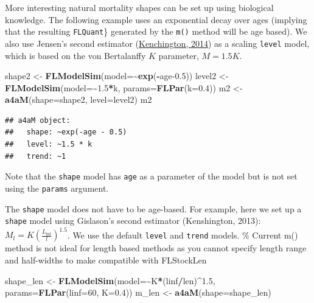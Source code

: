 \documentclass[
]{book}
\newenvironment{Shaded}{\begin{snugshade}}{\end{snugshade}}
\newcommand{\AttributeTok}[1]{\textcolor[rgb]{0.13,0.29,0.53}{#1}}
\newcommand{\DecValTok}[1]{\textcolor[rgb]{0.00,0.00,0.81}{#1}}
\newcommand{\FloatTok}[1]{\textcolor[rgb]{0.00,0.00,0.81}{#1}}
\newcommand{\FunctionTok}[1]{\textcolor[rgb]{0.13,0.29,0.53}{\textbf{#1}}}
\newcommand{\NormalTok}[1]{#1}
\newcommand{\OtherTok}[1]{\textcolor[rgb]{0.56,0.35,0.01}{#1}}
\newcommand{\SpecialCharTok}[1]{\textcolor[rgb]{0.81,0.36,0.00}{\textbf{#1}}}
\begin{document}
More interesting natural mortality shapes can be set up using biological knowledge. The following example uses an exponential decay over ages (implying that the resulting \texttt{FLQuant}\} generated by the \texttt{m()} method will be age based). We also use Jensen's second estimator (\href{http://onlinelibrary.wiley.com/doi/10.1111/faf.12027/abstract}{Kenchington, 2014}) as a scaling \texttt{level} model, which is based on the von Bertalanffy \(K\) parameter, \(M=1.5K\).

\begin{Shaded}
\begin{Highlighting}[]
\NormalTok{shape2 }\OtherTok{\textless{}{-}} \FunctionTok{FLModelSim}\NormalTok{(}\AttributeTok{model=}\SpecialCharTok{\textasciitilde{}}\FunctionTok{exp}\NormalTok{(}\SpecialCharTok{{-}}\NormalTok{age}\FloatTok{{-}0.5}\NormalTok{))}
\NormalTok{level2 }\OtherTok{\textless{}{-}} \FunctionTok{FLModelSim}\NormalTok{(}\AttributeTok{model=}\SpecialCharTok{\textasciitilde{}}\FloatTok{1.5}\SpecialCharTok{*}\NormalTok{k, }\AttributeTok{params=}\FunctionTok{FLPar}\NormalTok{(}\AttributeTok{k=}\FloatTok{0.4}\NormalTok{))}
\NormalTok{m2 }\OtherTok{\textless{}{-}} \FunctionTok{a4aM}\NormalTok{(}\AttributeTok{shape=}\NormalTok{shape2, }\AttributeTok{level=}\NormalTok{level2)}
\NormalTok{m2}
\end{Highlighting}
\end{Shaded}

\begin{verbatim}
## a4aM object:
##   shape: ~exp(-age - 0.5)
##   level: ~1.5 * k
##   trend: ~1
\end{verbatim}

Note that the \texttt{shape} model has \texttt{age} as a parameter of the model but is not set using the \texttt{params} argument.

The \texttt{shape} model does not have to be age-based. For example, here we set up a \texttt{shape} model using Gislason's second estimator (Kenshington, 2013): \(M_l=K(\frac{L_{\inf}}{l})^{1.5}\). We use the default \texttt{level} and \texttt{trend} models.
\% Current m() method is not ideal for length based methods as you cannot specify length range and half-widths to make compatible with FLStockLen

\begin{Shaded}
\begin{Highlighting}[]
\NormalTok{shape\_len }\OtherTok{\textless{}{-}} \FunctionTok{FLModelSim}\NormalTok{(}\AttributeTok{model=}\SpecialCharTok{\textasciitilde{}}\NormalTok{K}\SpecialCharTok{*}\NormalTok{(linf}\SpecialCharTok{/}\NormalTok{len)}\SpecialCharTok{\^{}}\FloatTok{1.5}\NormalTok{, }\AttributeTok{params=}\FunctionTok{FLPar}\NormalTok{(}\AttributeTok{linf=}\DecValTok{60}\NormalTok{, }\AttributeTok{K=}\FloatTok{0.4}\NormalTok{))}
\NormalTok{m\_len }\OtherTok{\textless{}{-}} \FunctionTok{a4aM}\NormalTok{(}\AttributeTok{shape=}\NormalTok{shape\_len)}
\end{Highlighting}
\end{Shaded}
\end{document}
